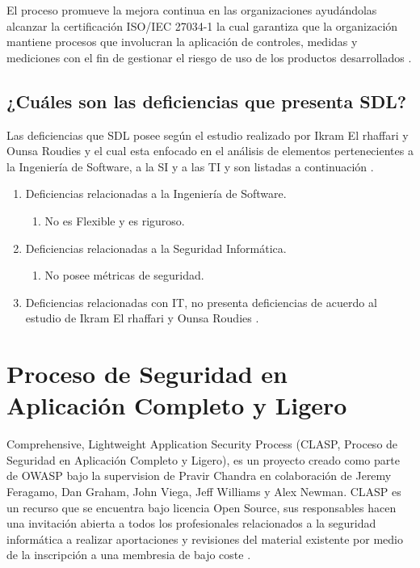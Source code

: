 \documentclass[runningheads,a4paper]{llncs}
\begin{document}
El proceso promueve la mejora continua en las organizaciones ayudándolas alcanzar la certificación ISO/IEC 27034-1 la cual garantiza que la organización mantiene procesos que involucran la aplicación de controles, medidas y mediciones con el fin de gestionar el riesgo de uso de los productos desarrollados \cite{SDLWhitePaper}. 

\subsection{¿Cuáles son las deficiencias que presenta \gls{SDL}?}
Las deficiencias que \gls{SDL} posee según el estudio realizado por Ikram El rhaffari y Ounsa Roudies y el cual esta enfocado en el análisis de elementos pertenecientes a la Ingeniería de \gls{Software}, a la \gls{SI} y a las \gls{TI} y son listadas a continuación \cite{BenchmarkingSDLCLAPS}. 

\begin{enumerate}
	\item Deficiencias relacionadas a la Ingeniería de \gls{Software}.
		\begin{enumerate}
			\item No es \gls{Flexible} y es riguroso.\\
			
		\end{enumerate}
	\item Deficiencias relacionadas a la Seguridad Informática.
		\begin{enumerate}
			\item No posee métricas de seguridad.\\
			
		\end{enumerate}
	\item Deficiencias relacionadas con \gls{IT}, no presenta deficiencias de acuerdo al estudio de Ikram El rhaffari y Ounsa Roudies \cite{BenchmarkingSDLCLAPS}.
		
\end{enumerate}

\section{Proceso de Seguridad en Aplicación Completo y Ligero}
Comprehensive, Lightweight Application Security Process (CLASP, Proceso de Seguridad en Aplicación Completo y Ligero), es un proyecto creado como parte de \gls{OWASP} bajo la supervision de Pravir Chandra en colaboración de Jeremy Feragamo, Dan Graham, John Viega, Jeff Williams y Alex Newman. \gls{CLASP} es un recurso que se encuentra bajo licencia \gls{Open Source}, sus responsables hacen una invitación abierta a todos los profesionales relacionados a la seguridad informática a realizar aportaciones y revisiones del material existente por medio de la inscripción a una membresia de bajo coste \cite{CLASPIntroduction}.
\end{document}
